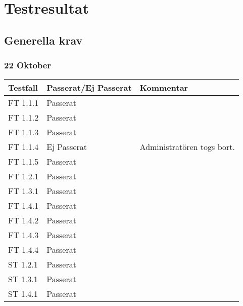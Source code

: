 \documentclass[a4paper]{article}
\begin{document}
\section{Testresultat}


\subsection{Generella krav}

\subsubsection{22 Oktober}
\begin{tabular}{| l | l | p{9cm} |}
\hline
Testfall & Passerat/Ej Passerat & Kommentar\\
\hline
FT 1.1.1 & Passerat & \\
\hline
FT 1.1.2 & Passerat & \\
\hline
FT 1.1.3 & Passerat & \\
\hline
FT 1.1.4 & Ej Passerat & Administratören togs bort.\\
\hline
FT 1.1.5 & Passerat & \\
\hline
FT 1.2.1 & Passerat & \\
\hline
FT 1.3.1 & Passerat & \\
\hline
FT 1.4.1 & Passerat & \\
\hline
FT 1.4.2 & Passerat & \\
\hline
FT 1.4.3 & Passerat & \\
\hline
FT 1.4.4 & Passerat & \\
\hline
ST 1.2.1 & Passerat & \\
\hline
ST 1.3.1 & Passerat & \\
\hline
ST 1.4.1 & Passerat & \\
\hline
\end{tabular}
\end{document}

